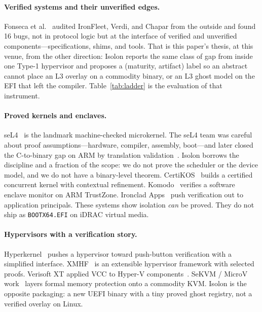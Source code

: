 \documentclass[sigplan,10pt,anonymous]{acmart}
\begin{document}
\paragraph{Verified systems and their unverified edges.}
Fonseca et al.~\cite{fonseca2017dsbugs} audited IronFleet, Verdi, and
Chapar from the outside and found 16 bugs, not in protocol logic but at the
interface of verified and unverified components---specifications, shims,
and tools. That is this paper's thesis, at this venue, from the other
direction: Isolon reports the same class of gap from inside one Type-1
hypervisor and proposes a (maturity, artifact) label so an abstract cannot
place an L3 overlay on a commodity binary, or an L3 ghost model on the EFI
that left the compiler. Table~\ref{tab:ladder} is the evaluation of that
instrument.

\paragraph{Proved kernels and enclaves.}
seL4~\cite{klein2009sel4,klein2014comprehensive,murray2013sel4} is the
landmark machine-checked microkernel. The seL4 team was careful about proof
assumptions---hardware, compiler, assembly, boot---and later closed the
C-to-binary gap on ARM by translation validation~\cite{sewell2013translation}.
Isolon borrows the discipline and a fraction of the scope: we do not prove
the scheduler or the device model, and we do not have a binary-level
theorem. CertiKOS~\cite{gu2016certikos,costanzo2016endtoend} builds a
certified concurrent kernel with contextual refinement.
Komodo~\cite{ferraiuolo2017komodo} verifies a software enclave monitor on ARM
TrustZone. Ironclad Apps~\cite{hawblitzel2013ironclad} push verification out
to application principals. These systems show isolation \emph{can} be
proved. They do not ship as \texttt{BOOTX64.EFI} on iDRAC virtual media.

\paragraph{Hypervisors with a verification story.}
Hyperkernel~\cite{nelson2017hyperkernel} pushes a hypervisor toward
push-button verification with a simplified interface.
XMHF~\cite{vasudevan2013xmhf} is an extensible hypervisor framework with
selected proofs. Verisoft XT applied VCC to Hyper-V
components~\cite{leinenbach2009verisoft}. SeKVM / MicroV
work~\cite{li2021varmour,li2021microhvisor} layers formal memory protection
onto a commodity KVM. Isolon is the opposite packaging: a new UEFI binary
with a tiny proved ghost registry, not a verified overlay on Linux.
\end{document}
